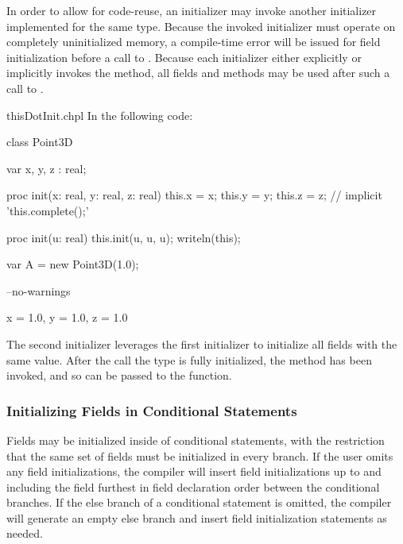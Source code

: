 In order to allow for code-reuse, an initializer may invoke another initializer
implemented for the same type. Because the invoked initializer must operate on
completely uninitialized memory, a compile-time error will be issued for field
initialization before a call to . Because each initializer
either explicitly or implicitly invokes the  method, all fields
and methods may be used after such a call to .

\begin{chapelexample}{thisDotInit.chpl}
In the following code:
\begin{chapel}
class Point3D {
  var x, y, z : real;

  proc init(x: real, y: real, z: real) {
    this.x = x;
    this.y = y;
    this.z = z;
    // implicit 'this.complete();'
  }

  proc init(u: real) {
    this.init(u, u, u);
    writeln(this);
  }
}

var A = new Point3D(1.0);
\end{chapel}
\begin{chapelcompopts}
--no-warnings
\end{chapelcompopts}
\begin{chapeloutput}
{x = 1.0, y = 1.0, z = 1.0}
\end{chapeloutput}
The second initializer leverages the first initializer to initialize all fields
with the same value. After the  call the type is fully initialized,
the  method has been invoked, and so  can be passed
to the  function.
\end{chapelexample}

\subsubsection{Initializing Fields in Conditional Statements}
\label{Initializing_Fields_in_Conditional_Statements}

Fields may be initialized inside of conditional statements, with the
restriction that the same set of fields must be initialized in every branch.
If the user omits any field initializations, the compiler will insert field
initializations up to and including the field furthest in field declaration
order between the conditional branches. If the else branch of a conditional
statement is omitted, the compiler will generate an empty else branch and
insert field initialization statements as needed.


